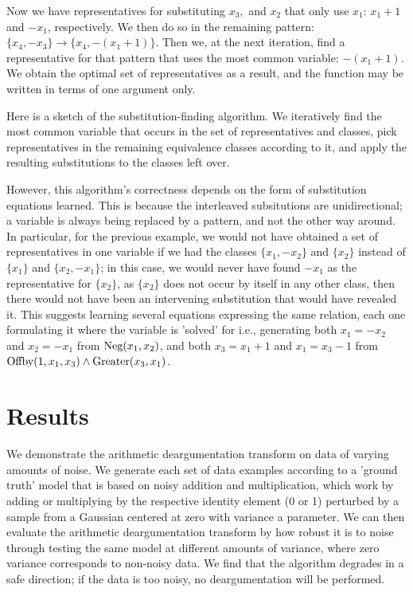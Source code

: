 \documentclass{acmsiggraph}
\begin{document}
Now we have representatives for substituting $x_3,$ and $x_2$
that only use $x_1$: $x_1 + 1$ and $-x_1$, respectively.
We then do so in the remaining pattern: $\{x_4, -x_3\} \rightarrow \{x_4, -(x_1 + 1)\}$.
Then we, at the next iteration,
find a representative for that pattern
that uses the most common variable: $-(x_1 + 1)$.
We obtain the optimal set of representatives
as a result,
and the function may be written in terms of one argument only.

Here is a sketch of the substitution-finding algorithm.
We iteratively find the most common variable that occurs
in the set of representatives and classes,
pick representatives in the remaining equivalence classes
according to it,
and apply the resulting substitutions to the classes left over.


However, this algorithm's correctness depends on the form of substitution equations learned.
This is because the interleaved subsitutions
are unidirectional; a variable is always being replaced by a pattern,
and not the other way around.
In particular,
for the previous example, 
we would not have obtained a set of representatives in one variable
if we had the classes $\{x_1, -x_2\}$ and $\{x_2\}$
instead of $\{x_1\}$ and $\{x_2, -x_1\}$;
in this case, we would never have found $-x_1$
as the representative for $\{x_2\}$, as $\{x_2\}$
does not occur by itself in any other class,
then there would not have been an intervening substitution
that would have revealed it.
This suggests learning several equations expressing the same relation,
each one formulating it where the variable is 'solved' for 
i.e., generating both $x_1 = -x_2$ and $x_2 = -x_1$ from $\textup{Neg}(x_1, x_2)$,
and both $x_3 = x_1 + 1$ and $x_1 = x_3 - 1$ from $\textup{Offby}(1, x_1, x_3) \wedge \textup{Greater}(x_3, x_1)$.

\section{Results}

We demonstrate the arithmetic deargumentation transform
on data of varying amounts of noise.
We generate each set of data examples
according to a 'ground truth' model
that is based on noisy addition and multiplication,
which work by adding or multiplying by the respective identity element (0 or 1)
perturbed by a sample from a Gaussian centered at zero
with variance a parameter.
We can then evaluate the arithmetic deargumentation transform
by how robust it is to noise
through testing the same model
at different amounts of variance,
where zero variance corresponds to non-noisy data.
We find that the algorithm degrades in a safe direction;
if the data is too noisy,
no deargumentation will be performed.
\end{document}
